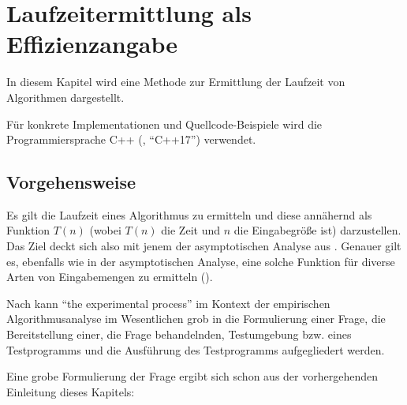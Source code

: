 \chapter{Laufzeitermittlung als Effizienzangabe}
\label{cha:praktische-effizienz}

In diesem Kapitel wird eine Methode zur Ermittlung der Laufzeit von Algorithmen dargestellt.

Für konkrete Implementationen und Quellcode-Beispiele wird die Programmiersprache C++ (\cite{ISO-C++17}, \enquote{C++17}) verwendet.


\section{Vorgehensweise}

Es gilt die Laufzeit eines Algorithmus zu ermitteln und diese annähernd als Funktion $T(n)$ (wobei $T(n)$ die Zeit und $n$ die Eingabegröße ist) darzustellen. Das Ziel deckt sich also mit jenem der asymptotischen Analyse aus . Genauer gilt es, ebenfalls wie in der asymptotischen Analyse, eine solche Funktion für diverse Arten von Eingabemengen zu ermitteln (\cite[27]{mcg2012}).

Nach \cite[10]{mcg2012} kann \enquote{the experimental process} im Kontext der empirischen Algorithmusanalyse im Wesentlichen grob in die Formulierung einer Frage, die Bereitstellung einer, die Frage behandelnden, Testumgebung bzw. eines Testprogramms und die Ausführung des Testprogramms aufgegliedert werden.

Eine grobe Formulierung der Frage ergibt sich schon aus der vorhergehenden Einleitung dieses Kapitels:


